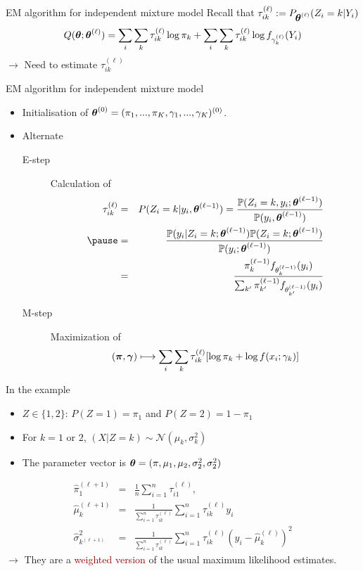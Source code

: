\documentclass{beamer}\usepackage[]{graphicx}\usepackage[]{color}
\newcommand{\emphase}[1]{\textcolor{darkred}{#1}}
\renewcommand{\P}{\mathbb{P}}
\newcommand{\Ncal}{\mathcal{N}}
\newcommand{\pibf}{\mbox{\mathversion{bold}{$\pi$}}}
\newcommand{\gammabf}{\mbox{\mathversion{bold}{$\gamma$}}}
\newcommand{\thetabf}{\mbox{\mathversion{bold}{$\theta$}}}
\begin{document}
\begin{frame}{EM algorithm for independent mixture model}
   Recall that $\tau_{ik}^{(\ell)}:=P_{\thetabf^{(\ell)}}(Z_i = k | Y_i )$
   $$Q(\thetabf;\thetabf^{(\ell)})
     =\sum_i \sum_k \tau_{ik}^{(\ell)} \log \pi_k +  \sum_i \sum_k \tau_{ik}^{(\ell)}\log f_{\gamma_k^{(\ell)}}(Y_i)$$
     $\rightarrow$ Need to estimate $\tau_{ik}^{(\ell)}$
\end{frame}

\begin{frame}{EM algorithm for independent mixture model}
    \begin{itemize}
    \item Initialisation of $\thetabf^{(0)}=(\pi_1, ..., \pi_K, \gamma_1, ..., \gamma_K)^{(0)}$.
  \pause
  \item Alternate  
      \begin{description}
      \item[E-step] Calculation of 
      \begin{eqnarray*}
      \tau^{(\ell)}_{ik}& = & P(Z_i = k | y_i, \thetabf^{(\ell-1)}) = \frac{\P(Z_i = k,   y_i; \thetabf^{(\ell-1)})}{\P(y_i, \thetabf^{(\ell-1)})}\\ 
      \pause
      &=&\frac{\P( y_i\vert Z_i = k ; \thetabf^{(\ell-1)}) \P( Z_i = k;  \thetabf^{(\ell-1)})}{\P(y_i; \thetabf^{(\ell-1)})}\\
      & = & \frac{\pi^{(\ell-1)}_k f_{\theta^{(\ell-1)}_k}(y_i)}{\sum_{k'} \pi^{(\ell-1)}_{k'}f_{\theta^{(\ell-1)}_{k'}}(y_i)}
      \end{eqnarray*}
\pause
      \item[M-step] Maximization of
        $$
        (\pibf, \gammabf) \longmapsto \sum_i \sum_k \tau_{ik}^{(\ell)} [\log \pi_k +
          \log f(x_i; \gamma_k)]
        $$
      \end{description} 
    \end{itemize}
\end{frame}

\begin{frame}{In the example}
\begin{itemize}  
\item $Z \in \{1,2\}$: $P(Z=1)=\pi_1$ and $P(Z=2)=1-\pi_1$  
\item For $k=1$ or $2$, $(X|Z=k) \sim \Ncal(\mu_k, \sigma_k^2)$ 
\item The parameter vector is $\thetabf=(\pi, \mu_1, \mu_2, \sigma_2^2, \sigma_2^2)$
\end{itemize}
   \begin{eqnarray*}
     \widehat{\pi}_1^{(\ell+1)} & = & \frac1{n} \sum_{i=1}^n \tau_{i1} ^{(\ell)}, \\
     \widehat{\mu}_k^{(\ell+1)} & = & \frac1{\sum_{i=1}^n  \tau_{ik} ^{(\ell)}} \sum_{i=1}^n \tau_{ik}^{(\ell)} y_i \\ 
     \widehat{\sigma}^2_{k^{(\ell+1)}} & = &  \frac1{\sum_{i=1}^n  \tau_{ik} ^{(\ell)}} \sum_{i=1}^n \tau_{ik}^{(\ell)} (y_i - \widehat{\mu}_k^{(\ell)})^2
  \end{eqnarray*}
   $\rightarrow$ They are a \emphase{weighted version} of the usual maximum
   likelihood estimates. 
\end{frame}
\end{document}
